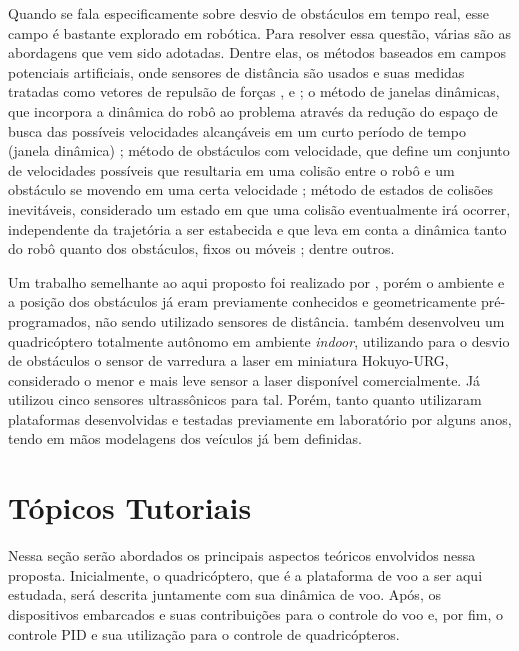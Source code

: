 \documentclass[a4paper, 12pt]{article}
\begin{document}

Quando se fala especificamente sobre desvio de obstáculos em tempo real, esse campo é bastante explorado em robótica. Para resolver essa questão, várias são as abordagens que vem sido adotadas. Dentre elas, os métodos baseados em campos potenciais artificiais,  onde sensores de distância são usados e suas medidas tratadas como vetores de repulsão de forças \cite{Bouktir2008}, \cite{Nieuwenhuisen2013} e \cite{Borenstein1989}; o método de janelas dinâmicas, que incorpora a dinâmica do robô ao problema através da redução do espaço de busca das possíveis velocidades alcançáveis em um curto período de tempo (janela dinâmica) \cite{Fox1997} \cite{Saranrittichai2013}; método de obstáculos com velocidade, que define um conjunto de velocidades possíveis que resultaria em uma colisão entre o robô e um obstáculo se movendo em uma certa velocidade \cite{Fiorini1998} \cite{Claes2012} \cite{Berg2012}; método de estados de colisões inevitáveis, considerado um estado em que uma colisão eventualmente irá ocorrer, independente da trajetória a ser estabecida e que leva em conta a dinâmica tanto do robô quanto dos obstáculos, fixos ou móveis \cite{Fraichard2004}; dentre outros.   

Um trabalho semelhante ao aqui proposto foi realizado por \cite{Israelsen}, porém o ambiente e a posição dos obstáculos já eram previamente conhecidos e geometricamente pré-programados, não sendo utilizado sensores de distância. \cite{Grzonka2012} também desenvolveu um quadricóptero totalmente autônomo em ambiente \textit{indoor}, utilizando para o desvio de obstáculos o sensor de varredura a laser em miniatura Hokuyo-URG, considerado o menor e mais leve sensor a laser disponível comercialmente. Já \cite{Becker2012} utilizou cinco sensores ultrassônicos para tal. Porém, tanto \cite{Grzonka2012} quanto \cite{Becker2012} utilizaram plataformas desenvolvidas e testadas previamente em laboratório por alguns anos, tendo em mãos modelagens dos veículos já bem definidas.



\newpage

\section{Tópicos Tutoriais}
\label{sec:tutoriais}

Nessa seção serão abordados os principais aspectos teóricos envolvidos nessa proposta. Inicialmente, 
o quadricóptero, que é a plataforma de voo a ser aqui estudada, será descrita juntamente com sua dinâmica de voo. Após, os dispositivos embarcados e suas contribuições para o controle do voo e, por fim, o controle PID e sua utilização para o controle de quadricópteros.
\end{document}
